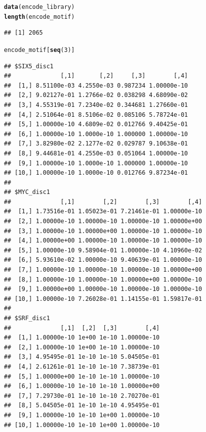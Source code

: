 \documentclass[a4paper,10pt]{article}\usepackage[]{graphicx}\usepackage[]{color}
\makeatletter
\newcommand{\hlnum}[1]{\textcolor[rgb]{0.686,0.059,0.569}{#1}}%
\newcommand{\hlstd}[1]{\textcolor[rgb]{0.345,0.345,0.345}{#1}}%
\newcommand{\hlkwd}[1]{\textcolor[rgb]{0.737,0.353,0.396}{\textbf{#1}}}%
\newenvironment{kframe}{%
 \def\at@end@of@kframe{}%
 \ifinner\ifhmode%
  \def\at@end@of@kframe{\end{minipage}}%
  \begin{minipage}{\columnwidth}%
 \fi\fi%
 \def\FrameCommand##1{\hskip\@totalleftmargin \hskip-\fboxsep
 \colorbox{shadecolor}{##1}\hskip-\fboxsep
     \hskip-\linewidth \hskip-\@totalleftmargin \hskip\columnwidth}%
 \MakeFramed {\advance\hsize-\width
   \@totalleftmargin\z@ \linewidth\hsize
   \@setminipage}}%
 {\par\unskip\endMakeFramed%
 \at@end@of@kframe}
\newenvironment{knitrout}{}{} %
\makeatother
\begin{document}
\begin{knitrout}
\color{fgcolor}\begin{kframe}
\begin{alltt}
\hlkwd{data}\hlstd{(encode_library)}
\hlkwd{length}\hlstd{(encode_motif)}
\end{alltt}
\begin{verbatim}
## [1] 2065
\end{verbatim}
\begin{alltt}
\hlstd{encode_motif[}\hlkwd{seq}\hlstd{(}\hlnum{3}\hlstd{)]}
\end{alltt}
\begin{verbatim}
## $SIX5_disc1
##              [,1]       [,2]     [,3]        [,4]
##  [1,] 8.51100e-03 4.2550e-03 0.987234 1.00000e-10
##  [2,] 9.02127e-01 1.2766e-02 0.038298 4.68090e-02
##  [3,] 4.55319e-01 7.2340e-02 0.344681 1.27660e-01
##  [4,] 2.51064e-01 8.5106e-02 0.085106 5.78724e-01
##  [5,] 1.00000e-10 4.6809e-02 0.012766 9.40425e-01
##  [6,] 1.00000e-10 1.0000e-10 1.000000 1.00000e-10
##  [7,] 3.82980e-02 2.1277e-02 0.029787 9.10638e-01
##  [8,] 9.44681e-01 4.2550e-03 0.051064 1.00000e-10
##  [9,] 1.00000e-10 1.0000e-10 1.000000 1.00000e-10
## [10,] 1.00000e-10 1.0000e-10 0.012766 9.87234e-01
## 
## $MYC_disc1
##              [,1]        [,2]        [,3]        [,4]
##  [1,] 1.73516e-01 1.05023e-01 7.21461e-01 1.00000e-10
##  [2,] 1.00000e-10 1.00000e-10 1.00000e-10 1.00000e+00
##  [3,] 1.00000e-10 1.00000e+00 1.00000e-10 1.00000e-10
##  [4,] 1.00000e+00 1.00000e-10 1.00000e-10 1.00000e-10
##  [5,] 1.00000e-10 9.58904e-01 1.00000e-10 4.10960e-02
##  [6,] 5.93610e-02 1.00000e-10 9.40639e-01 1.00000e-10
##  [7,] 1.00000e-10 1.00000e-10 1.00000e-10 1.00000e+00
##  [8,] 1.00000e-10 1.00000e-10 1.00000e+00 1.00000e-10
##  [9,] 1.00000e+00 1.00000e-10 1.00000e-10 1.00000e-10
## [10,] 1.00000e-10 7.26028e-01 1.14155e-01 1.59817e-01
## 
## $SRF_disc1
##              [,1]  [,2]  [,3]        [,4]
##  [1,] 1.00000e-10 1e+00 1e-10 1.00000e-10
##  [2,] 1.00000e-10 1e+00 1e-10 1.00000e-10
##  [3,] 4.95495e-01 1e-10 1e-10 5.04505e-01
##  [4,] 2.61261e-01 1e-10 1e-10 7.38739e-01
##  [5,] 1.00000e+00 1e-10 1e-10 1.00000e-10
##  [6,] 1.00000e-10 1e-10 1e-10 1.00000e+00
##  [7,] 7.29730e-01 1e-10 1e-10 2.70270e-01
##  [8,] 5.04505e-01 1e-10 1e-10 4.95495e-01
##  [9,] 1.00000e-10 1e-10 1e+00 1.00000e-10
## [10,] 1.00000e-10 1e-10 1e+00 1.00000e-10
\end{verbatim}
\end{kframe}
\end{knitrout}
\end{document}
